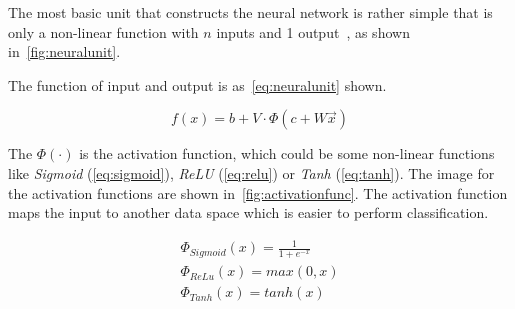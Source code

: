 \begin{spacing}{1.5}
The most basic unit that constructs the neural network is rather simple that is only a non-linear function with $n$ inputs and 1 output~\cite{bengio2017deep}, as shown in~\autoref{fig:neuralunit}. 

The function of input and output is as~\autoref{eq:neuralunit} shown. 

\begin{equation}
\label{eq:neuralunit}
    f(x)=b+V \cdot \Phi (c+W \vec{x})
\end{equation}

The $\Phi (\cdot)$ is the activation function, which could be some non-linear functions like \textit{Sigmoid} (\autoref{eq:sigmoid}), \textit{ReLU} (\autoref{eq:relu}) or \textit{Tanh} (\autoref{eq:tanh}). The image for the activation functions are shown in~\autoref{fig:activationfunc}. The activation function maps the input to another data space which is easier to perform classification. 

\begin{gather}
   \Phi_{Sigmoid}(x)=\frac{1}{1+e^{-x}} \label{eq:sigmoid}\\
   \Phi_{ReLu}(x)=max(0,x) \label{eq:relu}\\
   \Phi_{Tanh}(x)=tanh(x) \label{eq:tanh}
\end{gather}


\end{spacing}

